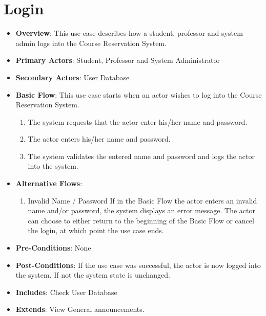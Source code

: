 \documentclass[12pt, a4]{report}
\begin{document}
\section{Login}
\begin{itemize}
    \item \textbf{Overview}: This use case describes how a student, professor and system admin logs into the Course Reservation System.
    \item \textbf{Primary Actors}: Student, Professor and System Administrator
    \item \textbf{Secondary Actors}: User Database
    \item \textbf{Basic Flow}: This use case starts when an actor wishes to log into the Course Reservation System.
        \begin{enumerate}
            \item The system requests that the actor enter his/her name and password.
            \item The actor enters his/her name and password.
            \item The system validates the entered name and password and logs the actor into the system.
        \end{enumerate}
    \item \textbf{Alternative Flows}:
        \begin{enumerate}
            \item Invalid Name / Password \newline
            If in the Basic Flow the actor enters an invalid name and/or password, the system displays an error message. The actor can choose to either return to the beginning of the Basic Flow or cancel the login, at which point the use case ends.
        \end{enumerate}
    \item \textbf{Pre-Conditions}: None
    \item \textbf{Post-Conditions}: If the use case was successful, the actor is now logged into the system. If not the system state is unchanged.
    \item \textbf{Includes}: Check User Database
    \item \textbf{Extends}: View General announcements.
\end{itemize}

\end{document}
